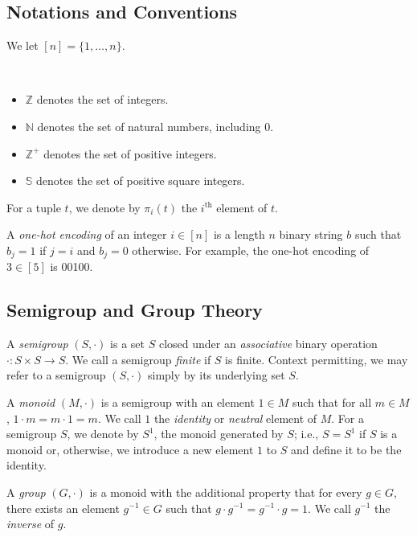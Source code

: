 \documentclass[a4paper,UKenglish,cleveref, autoref, thm-restate, anonymous]{lipics-v2021}
\begin{document}
\subsection{Notations and Conventions}\label{sec:backgroundconv}

\begin{definition}
    We let $[n] = \{1, \dots, n\}$.
\end{definition}

\begin{definition}
    \,
    \begin{itemize}
        \item $\mathbb{Z}$ denotes the set of integers.
        \item $\mathbb{N}$ denotes the set of natural numbers, including 0.
        \item $\mathbb{Z}^+$ denotes the set of positive integers.
        \item $\mathbb{S}$ denotes the set of positive square integers.
    \end{itemize}
\end{definition}

\begin{definition}
    For a tuple $t$, we denote by $\pi_i(t)$ the $i^{\text{th}}$ element of $t$.
\end{definition}

\begin{definition}
    A \emph{one-hot encoding} of an integer $i \in [n]$ is a length $n$ binary string $b$ such that $b_j = 1$ if $j = i$ and $b_j = 0$ otherwise. For example, the one-hot encoding of $3 \in [5]$ is 00100.
\end{definition}

\subsection{Semigroup and Group Theory}\label{sec:backgroundsemi}

\begin{definition}
    A \emph{semigroup} $(S, \cdot)$ is a set $S$ closed under an \emph{associative} binary operation $\cdot : S \times S \rightarrow S$. We call a semigroup \emph{finite} if $S$ is finite. Context permitting, we may refer to a semigroup $(S, \cdot)$ simply by its underlying set $S$.

    A \emph{monoid} $(M, \cdot)$ is a semigroup with an element $1 \in M$ such that for all $m \in M$, $1 \cdot m = m \cdot 1 = m$. We call $1$ the \emph{identity} or \emph{neutral} element of $M$. For a semigroup $S$, we denote by $S^1$, the monoid generated by $S$; i.e., $S = S^1$ if $S$ is a monoid or, otherwise, we introduce a new element $1$ to $S$ and define it to be the identity.

    A \emph{group} $(G, \cdot)$ is a monoid with the additional property that for every $g \in G$, there exists an element $g^{-1} \in G$ such that $g \cdot g^{-1} = g^{-1} \cdot g = 1$. We call $g^{-1}$ the \emph{inverse} of $g$.
\end{definition}
\end{document}
